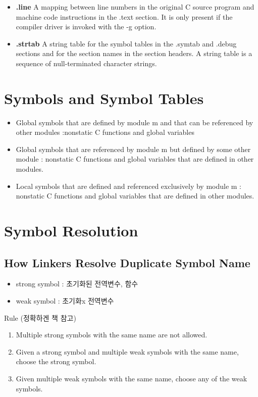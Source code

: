 \begin{itemize}
    \item \textbf{.line} A mapping between line numbers in the original C source program and machine code instructions in the .text section. It is only present if the compiler driver is invoked with the -g option.
    \item \textbf{.strtab} A string table for the symbol tables in the .symtab and .debug sections and for the section names in the section headers. A string table is a sequence of null-terminated character strings.
\end{itemize}

\section{Symbols and Symbol Tables}

\begin{itemize}
    \item Global symbols that are defined by module m and that can be referenced by other modules :nonstatic C functions and global variables
    \item Global symbols that are referenced by module m but defined by some other module : nonstatic C functions and global variables that are defined in other modules.
    \item Local symbols that are defined and referenced exclusively by module m : nonstatic C functions and global variables that are defined in other modules.
\end{itemize}

\section{Symbol Resolution}

\subsection{How Linkers Resolve Duplicate Symbol Name}

\begin{itemize}
    \item strong symbol : 초기화된 전역변수, 함수
    \item weak symbol : 초기화x 전역변수
\end{itemize}

Rule (정확하겐 책 참고)
\begin{enumerate}
    \item Multiple strong symbols with the same name are not allowed.
    \item Given a strong symbol and multiple weak symbols with the same name, choose the strong symbol.
    \item Given multiple weak symbols with the same name, choose any of the weak symbols.
\end{enumerate}

